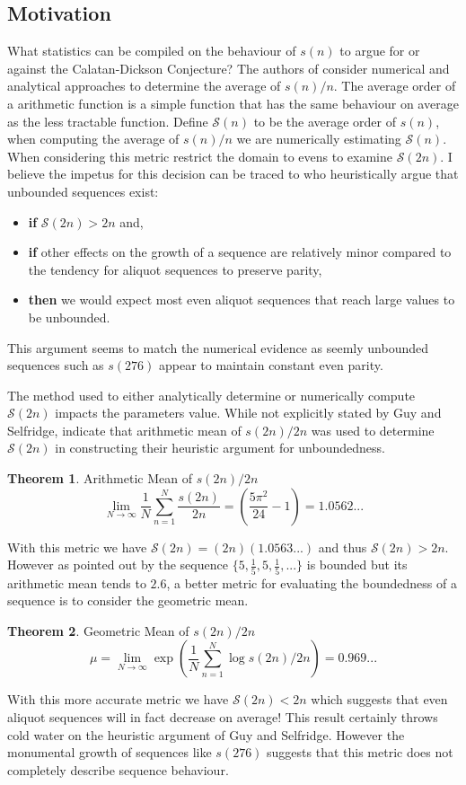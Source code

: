 \documentclass{article}
\theoremstyle{definition}
\newtheorem{theorem}{Theorem}[section]
\begin{document}
\subsection{Motivation}
What statistics can be compiled on the behaviour of $s(n)$ to argue for or against the Calatan-Dickson Conjecture? The authors of \cite{chum_guy_jacobson_mosunov_2018} consider numerical and analytical approaches to determine the average of $s(n) / n$. The average order of a arithmetic function is a simple function that has the same behaviour on average as the less tractable function. Define $\mathcal{S}(n)$ to be the average order of $s(n)$, when computing the average of $s(n) / n$ we are numerically estimating $\mathcal{S}(n)$. When considering this metric \cite{chum_guy_jacobson_mosunov_2018} restrict the domain to evens to examine $\mathcal{S}(2n)$. I believe the impetus for this decision can be traced to \cite{guy_selfridge_1975} who heuristically argue that unbounded sequences exist:
\begin{itemize}
    \item \textbf{if} $\mathcal{S}(2n) > 2n$ and,
    \item \textbf{if} other effects on the growth of a sequence are relatively minor compared to the tendency for aliquot sequences to preserve parity,
    \item \textbf{then} we would expect most even aliquot sequences that reach large values to be unbounded.
\end{itemize}
This argument seems to match the numerical evidence as seemly unbounded sequences such as $s(276)$ appear to maintain constant even parity.

The method used to either analytically determine or numerically compute $\mathcal{S}(2n)$ impacts the parameters value. While not explicitly stated by Guy and Selfridge, \cite{bosma_kane_2010} indicate that arithmetic mean of $s(2n) / 2n$ was used to determine $\mathcal{S}(2n)$ in constructing their heuristic argument for unboundedness.
%
\begin{theorem} Arithmetic Mean of $s(2n) / 2n$
    $$\lim_{N \to \infty} \frac{1}{N} \sum_{n = 1}^{N} \frac{s(2n)}{2n} = \left(\frac{5\pi^2}{24} - 1\right) = 1.0562...$$
\end{theorem}
%
With this metric we have $\mathcal{S}(2n) = (2n)(1.0563...)$ and thus $\mathcal{S}(2n) > 2n$. However as pointed out by \cite{bosma_kane_2010} the sequence $\{5, \frac{1}{5}, 5, \frac{1}{5}, ... \}$ is bounded but its arithmetic mean tends to $2.6$, a better metric for evaluating the boundedness of a sequence is to consider the geometric mean.
%
\begin{theorem}Geometric Mean of $s(2n) / 2n$
    $$\mu =\lim_{N \to \infty} \exp{\left( \frac{1}{N} \sum_{n=1}^{N} \log s(2n) / 2n \right) =  0.969...}$$
\end{theorem}
%
With this more accurate metric we have $\mathcal{S}(2n) < 2n$ which suggests that even aliquot sequences will in fact decrease on average! This result certainly throws cold water on the heuristic argument of Guy and Selfridge. However the monumental growth of sequences like $s(276)$ suggests that this metric does not completely describe sequence behaviour.
\end{document}
